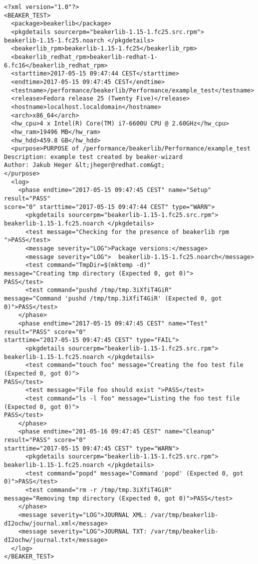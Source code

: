 \begin{minipage}{\linewidth}
\begin{lstlisting}[style=xml_journal,caption={Example of journal.xml},label={lst:journalxml_example}]
<?xml version="1.0"?>
<BEAKER_TEST>
  <package>beakerlib</package>
  <pkgdetails sourcerpm="beakerlib-1.15-1.fc25.src.rpm">
beakerlib-1.15-1.fc25.noarch </pkgdetails>
  <beakerlib_rpm>beakerlib-1.15-1.fc25</beakerlib_rpm>
  <beakerlib_redhat_rpm>beakerlib-redhat-1-6.fc16</beakerlib_redhat_rpm>
  <starttime>2017-05-15 09:47:44 CEST</starttime>
  <endtime>2017-05-15 09:47:45 CEST</endtime>
  <testname>/performance/beakerlib/Performance/example_test</testname>
  <release>Fedora release 25 (Twenty Five)</release>
  <hostname>localhost.localdomain</hostname>
  <arch>x86_64</arch>
  <hw_cpu>4 x Intel(R) Core(TM) i7-6600U CPU @ 2.60GHz</hw_cpu>
  <hw_ram>19496 MB</hw_ram>
  <hw_hdd>459.8 GB</hw_hdd>
  <purpose>PURPOSE of /performance/beakerlib/Performance/example_test
Description: example test created by beaker-wizard
Author: Jakub Heger &lt;jheger@redhat.com&gt;
</purpose>
  <log>
    <phase endtime="2017-05-15 09:47:45 CEST" name="Setup" result="PASS" 
score="0" starttime="2017-05-15 09:47:44 CEST" type="WARN">
      <pkgdetails sourcerpm="beakerlib-1.15-1.fc25.src.rpm">
beakerlib-1.15-1.fc25.noarch </pkgdetails>
      <test message="Checking for the presence of beakerlib rpm ">PASS</test>
      <message severity="LOG">Package versions:</message>
      <message severity="LOG">  beakerlib-1.15-1.fc25.noarch</message>
      <test command="TmpDir=$(mktemp -d)" 
message="Creating tmp directory (Expected 0, got 0)">
PASS</test>
      <test command="pushd /tmp/tmp.3iXfiT4GiR" 
message="Command 'pushd /tmp/tmp.3iXfiT4GiR' (Expected 0, got 0)">PASS</test>
    </phase>
    <phase endtime="2017-05-15 09:47:45 CEST" name="Test" result="PASS" score="0" 
starttime="2017-05-15 09:47:45 CEST" type="FAIL">
      <pkgdetails sourcerpm="beakerlib-1.15-1.fc25.src.rpm">
beakerlib-1.15-1.fc25.noarch </pkgdetails>
      <test command="touch foo" message="Creating the foo test file (Expected 0, got 0)">
PASS</test>
      <test message="File foo should exist ">PASS</test>
      <test command="ls -l foo" message="Listing the foo test file (Expected 0, got 0)">
PASS</test>
    </phase>
    <phase endtime="201-05-16 09:47:45 CEST" name="Cleanup" result="PASS" score="0" 
starttime="2017-05-15 09:47:45 CEST" type="WARN">
      <pkgdetails sourcerpm="beakerlib-1.15-1.fc25.src.rpm">
beakerlib-1.15-1.fc25.noarch </pkgdetails>
      <test command="popd" message="Command 'popd' (Expected 0, got 0)">PASS</test>
      <test command="rm -r /tmp/tmp.3iXfiT4GiR" 
message="Removing tmp directory (Expected 0, got 0)">PASS</test>
    </phase>
    <message severity="LOG">JOURNAL XML: /var/tmp/beakerlib-dI2ochw/journal.xml</message>
    <message severity="LOG">JOURNAL TXT: /var/tmp/beakerlib-dI2ochw/journal.txt</message>
  </log>
</BEAKER_TEST>

\end{lstlisting}
\end{minipage}

